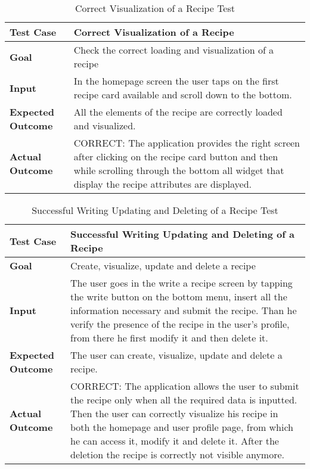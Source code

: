 \begin{table}[H]
	\centering
	\begin{tabular}{|l|l|}
		\hline
		\textbf{Test Case}& Correct Visualization of a Recipe\\
		\hline
		\textbf{Goal}& Check the correct loading and visualization of a recipe\\
		\hline
		\textbf{Input}& 
		\begin{minipage}{.7\linewidth}
			In the homepage screen the user taps on the first recipe card available and scroll down to the bottom.
		\end{minipage}\\
		\hline
		\textbf{Expected Outcome}& All the elements of the recipe are correctly loaded and visualized.\\
		\hline
		\textbf{Actual Outcome}& 
		\begin{minipage}{.7\linewidth}
			CORRECT: The application provides the right screen after clicking on the recipe card button and then while scrolling through the bottom all widget that display the recipe attributes are displayed.
		\end{minipage}\\
		\hline	
	\end{tabular}
	\caption{Correct Visualization of a Recipe Test}
\end{table}

\begin{table}[H]
	\centering
	\begin{tabular}{|l|l|}
		\hline
		\textbf{Test Case}& Successful Writing Updating and Deleting of a Recipe\\
		\hline
		\textbf{Goal}&Create, visualize, update and delete a recipe\\
		\hline
		\textbf{Input}& 
		\begin{minipage}{.7\linewidth}
			The user goes in the write a recipe screen by tapping the write button on the bottom menu, insert all the information necessary and submit the recipe. Than he verify the presence of the recipe in the user's profile, from there he first modify it and then delete it.
		\end{minipage}\\
		\hline
		\textbf{Expected Outcome}& The user can create, visualize, update and delete a recipe.\\
		\hline
		\textbf{Actual Outcome}& 
		\begin{minipage}{.7\linewidth}
			CORRECT: The application allows the user to submit the recipe only when all the required data is inputted. Then the user can correctly visualize his recipe in both the homepage and user profile page, from which he can access it, modify it and delete it. After the deletion the recipe is correctly not visible anymore.
		\end{minipage}\\
		\hline	
	\end{tabular}
	\caption{Successful Writing Updating and Deleting of a Recipe Test}
\end{table}

